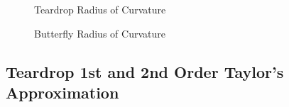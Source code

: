\begin{figure}
	\caption  {Teardrop Radius of Curvature}
	\label{img-chap4-Teardrop Radius of Curvature.pdf}
	\centering
{}
\end{figure}	


\begin{figure}
	\caption  {Butterfly Radius of Curvature}
	\label{img-chap4-Butterfly Radius of Curvature.pdf}
	\centering
{}
\end{figure}	

\clearpage
\pagebreak

\subsection{Teardrop 1st and 2nd Order Taylor's Approximation} 
\label{ssec-chap4-Teardrop 1st and 2nd Taylor's Approximation}

